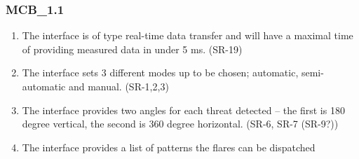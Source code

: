 \documentclass[Main]{subfiles}
\begin{document}
\subsubsection{MCB\_1.1}
\begin{enumerate}[{4.1.3.1}-1]
\setcounter{enumi}{0}

\item The interface is of type real-time data transfer and will have a maximal time of providing measured data in under 5 ms. (SR-19)

\item The interface sets 3 different modes up to be chosen; automatic, semi-automatic and manual. (SR-1,2,3)

\item The interface provides two angles for each threat detected -- the first is 180 degree vertical, the second is 360 degree horizontal. (SR-6, SR-7 (SR-9?))

\item The interface provides a list of patterns the flares can be dispatched 
\end{enumerate}

\end{document}
